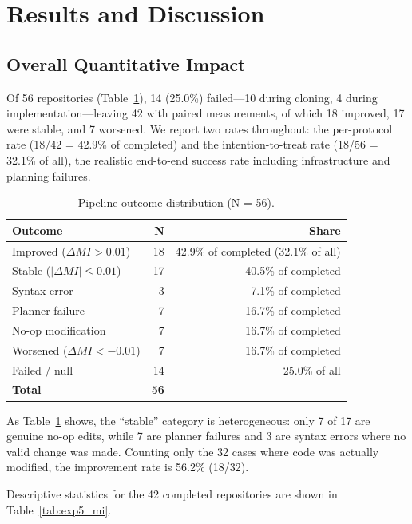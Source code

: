 \documentclass[runningheads]{llncs}
\begin{document}
\section{Results and Discussion}

\subsection{Overall Quantitative Impact}

Of 56 repositories (Table~\ref{tab:exp5_outcomes}), 14 (25.0\%) failed---10 during cloning, 4 during implementation---leaving 42 with paired measurements, of which 18 improved, 17 were stable, and 7 worsened. We report two rates throughout: the per-protocol rate (18/42 = 42.9\% of completed) and the intention-to-treat rate (18/56 = 32.1\% of all), the realistic end-to-end success rate including infrastructure and planning failures.

\begin{table}[H]
\centering
\small
\caption{Pipeline outcome distribution (N = 56).}
\label{tab:exp5_outcomes}
\begin{tabular}{lrr}
\toprule
\textbf{Outcome} & \textbf{N} & \textbf{Share} \\
\midrule
Improved ($\Delta MI > 0.01$)  & 18 & 42.9\% of completed (32.1\% of all) \\
Stable ($|\Delta MI| \le 0.01$)    & 17 & 40.5\% of completed \\
\quad Syntax error          & 3  & 7.1\% of completed \\
\quad Planner failure       & 7  & 16.7\% of completed \\
\quad No-op modification    & 7  & 16.7\% of completed \\
Worsened ($\Delta MI < -0.01$)  & 7  & 16.7\% of completed \\
Failed / null               & 14 & 25.0\% of all \\
\midrule
\textbf{Total} & \textbf{56} & \\
\bottomrule
\end{tabular}
\end{table}

As Table~\ref{tab:exp5_outcomes} shows, the ``stable'' category is heterogeneous: only 7 of 17 are genuine no-op edits, while 7 are planner failures and 3 are syntax errors where no valid change was made. Counting only the 32 cases where code was actually modified, the improvement rate is 56.2\% (18/32).

Descriptive statistics for the 42 completed repositories are shown in Table~\ref{tab:exp5_mi}.
\end{document}
